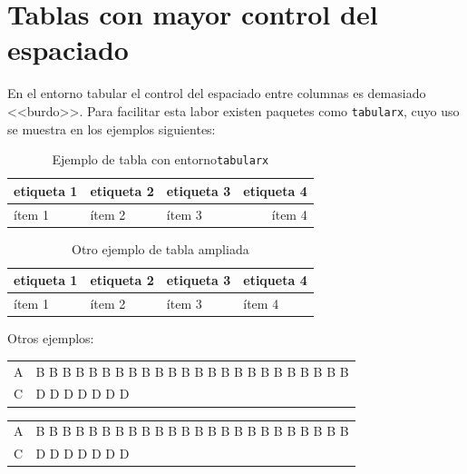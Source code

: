 \documentclass[ 		%
	11pt,				%
	a4paper,			%
	twoside,			%
	openright,			%
	final       		%
]{book}
\begin{document}
\section{Tablas con mayor control del espaciado}
En el entorno tabular el control del espaciado entre columnas es demasiado <<burdo>>. Para facilitar esta labor existen paquetes como \texttt{tabularx}, cuyo uso se muestra en los ejemplos siguientes:

\begin{table}[H]
   \centering
   	\caption{Ejemplo de tabla con entorno\texttt{tabularx}}					\label{tab:tabularx1}
   \begin{tabularx}{\textwidth}%
   { |X|X|X|r| }
   \hline
   etiqueta 1 & etiqueta 2 & etiqueta 3 & etiqueta 4 \\
   \hline
   ítem 1     & ítem 2     & ítem 3     & ítem 4  \\
   \hline
	\end{tabularx}
\end{table}


\begin{table}[H]
	\centering
    \caption{Otro ejemplo de tabla ampliada}
    \label{tab:tabularx2}
	\begin{tabularx}{\textwidth}{ |l|R|l|R| }
  	\hline
   etiqueta 1 & etiqueta 2 & etiqueta 3 & etiqueta 4 \\
   \hline
   ítem 1     & ítem 2     & ítem 3     & ítem 4  \\
  	\hline
   \end{tabularx}
\end{table}

Otros ejemplos:

\begin{center}
\begin{tabular}{lp{2cm}}
\hline
A & B B B B B B B B B B B B B B B B B B B B B B B B\\
C & D D D D D D D\\
\hline
\end{tabular}
\end{center}

\begin{center}  
\begin{tabularx}{.5\textwidth}{lX}
\hline
A & B B B B B B B B B B B B B B B B B B B B B B B B\\
C & D D D D D D D\\
\hline
\end{tabularx}
\end{center}
\end{document}
